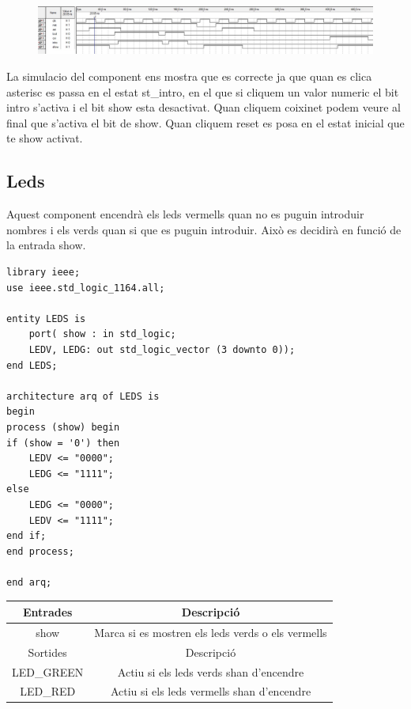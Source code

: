 \documentclass[12pt, a4papre]{article}
\begin{document}
	\begin{figure}[H]
		\begin{center}
		\includegraphics[width=130mm]{SimControl.jpeg}
		\end{center}
	\end{figure}
	
	La simulacio del component ens mostra que es correcte ja que quan es clica asterisc es passa en el estat st\_intro, en el que si cliquem un valor numeric el bit intro s'activa i el bit show esta desactivat. Quan cliquem coixinet podem veure al final que s'activa el bit de show. Quan cliquem reset es posa en el estat inicial que te show activat.
	
	
	\subsection{Leds}
	
	Aquest component encendrà els leds vermells quan no es puguin introduir nombres i els verds quan si que es puguin introduir. Això es decidirà en funció de la entrada show.
	
		\begin{lstlisting}[style=vhdl, frame=single, basicstyle=\small]
library ieee;
use ieee.std_logic_1164.all;

entity LEDS is 
	port( show : in std_logic;
	LEDV, LEDG: out std_logic_vector (3 downto 0));
end LEDS;

architecture arq of LEDS is
begin
process (show) begin
if (show = '0') then
	LEDV <= "0000";
	LEDG <= "1111";
else
	LEDG <= "0000";
	LEDV <= "1111";
end if;
end process;

end arq;

\end{lstlisting}
	
		\begin{table}[H]
		\centering
		 \begin{tabular}{|c | c|} 
			 \hline
			 Entrades & Descripció\\ [0.5ex] 
			 \hline
			 show & Marca si es mostren els leds verds o els vermells \\ [1ex] 
			 \hline\hline
			 Sortides & Descripció\\ [0.5ex] 
			 \hline
			 LED\_GREEN & Actiu si els leds verds shan d'encendre\\
			LED\_RED & Actiu si els leds vermells shan d'encendre\\ [1ex] 
			 \hline
		 \end{tabular}
	\end{table}
	
\end{document}

